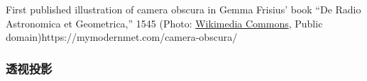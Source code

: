\documentclass{beamer}
\begin{document}
{{{{\begin{frame}
  \label{attachment_494307}\qquad{}
  
  \label{caption-attachment-494307}First published illustration of camera
  obscura in Gemma Frisius' book ``De Radio Astronomica et Geometrica,'' 1545
  (Photo:
  \href{https://commons.wikimedia.org/wiki/File:1545_gemma_frisius_-_camera-obscura-sonnenfinsternis_1545-650x337.jpg}{Wikimedia
  Commons}, Public domain)https://mymodernmet.com/camera-obscura/
\end{frame}}{\begin{frame}
  \frametitle{透视投影}
  
  \
  
  \
  
  {\hspace{3em}}
  \begin{eqnarray*}
    &  & 
  \end{eqnarray*}
\end{frame}}{\begin{frame}
  \frametitle{}
  
  \
  

\end{frame}}}}}
\end{document}
